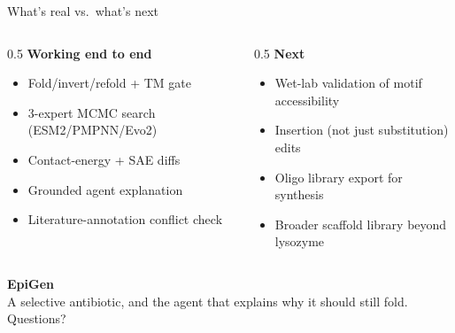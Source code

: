 \documentclass[aspectratio=169]{beamer}
\begin{document}
\begin{frame}{What's real vs.\ what's next}
  \begin{columns}
    \begin{column}{0.5\textwidth}
      \textbf{Working end to end}
      \begin{itemize}
        \small
        \item Fold/invert/refold + TM gate
        \item 3-expert MCMC search (ESM2/PMPNN/Evo2)
        \item Contact-energy + SAE diffs
        \item Grounded agent explanation
        \item Literature-annotation conflict check
      \end{itemize}
    \end{column}
    \begin{column}{0.5\textwidth}
      \textbf{Next}
      \begin{itemize}
        \small
        \item Wet-lab validation of motif accessibility
        \item Insertion (not just substitution) edits
        \item Oligo library export for synthesis
        \item Broader scaffold library beyond lysozyme
      \end{itemize}
    \end{column}
  \end{columns}
\end{frame}

\begin{frame}
  \centering
  \Large\textbf{EpiGen}\\[0.3em]
  \normalsize A selective antibiotic, and the agent that explains why it should still fold.\\[1.5em]
  \small Questions?
\end{frame}
\end{document}

